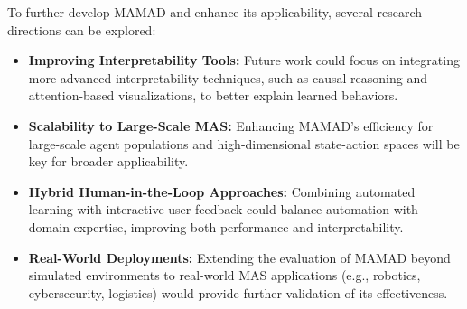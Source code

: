 \documentclass[pdflatex,sn-mathphys-num]{sn-jnl}%
\theoremstyle{thmstyleone}%
\theoremstyle{thmstyletwo}%
\theoremstyle{thmstylethree}%
\begin{document}
To further develop MAMAD and enhance its applicability, several research directions can be explored:
%
\begin{itemize}
    \item \textbf{Improving Interpretability Tools:} Future work could focus on integrating more advanced interpretability techniques, such as causal reasoning and attention-based visualizations, to better explain learned behaviors.
    \item \textbf{Scalability to Large-Scale MAS:} Enhancing MAMAD's efficiency for large-scale agent populations and high-dimensional state-action spaces will be key for broader applicability.
    \item \textbf{Hybrid Human-in-the-Loop Approaches:} Combining automated learning with interactive user feedback could balance automation with domain expertise, improving both performance and interpretability.
    \item \textbf{Real-World Deployments:} Extending the evaluation of MAMAD beyond simulated environments to real-world MAS applications (e.g., robotics, cybersecurity, logistics) would provide further validation of its effectiveness.
\end{itemize}





\end{document}
